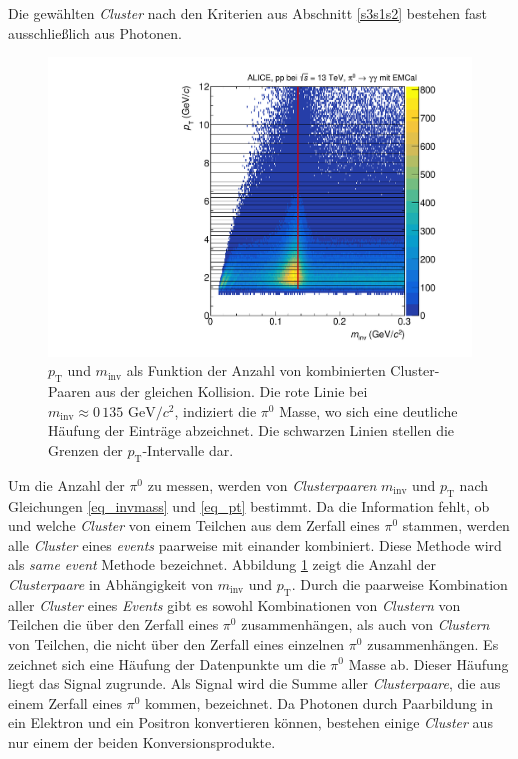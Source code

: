 Die gewählten \textit{Cluster} nach den Kriterien aus Abschnitt \ref{s3s1s2} bestehen fast ausschließlich aus Photonen.
\begin{figure}[t!]
\centering
\includegraphics[width=.7\linewidth]{hInvMass_pT_Signal.pdf}
\caption{$p_\text{T}$ und $m_\text{inv}$ als Funktion der Anzahl von kombinierten  Cluster-Paaren aus der gleichen Kollision.
Die rote Linie bei $m_{\text{inv}}\approx0\,135\text{ GeV/}c^{2}$, indiziert die $\pi^{0}$ Masse, wo sich eine deutliche Häufung der Einträge abzeichnet.
Die schwarzen Linien stellen die Grenzen der $p_{\text{T}}$-Intervalle dar.}
\label{figInvMassPt_a}
\end{figure}
\newline
Um die Anzahl der $\pi^{0}$ zu messen, werden von \textit{Clusterpaaren} $m_\text{inv}$ und $p_\text{T}$ nach Gleichungen \ref{eq_invmass} und \ref{eq_pt} bestimmt.
Da die Information fehlt, ob und welche \textit{Cluster} von einem Teilchen aus dem Zerfall eines $\pi^{0}$ stammen, werden alle \textit{Cluster} eines \textit{events} paarweise mit einander kombiniert.
Diese Methode wird als \textit{same event} Methode bezeichnet.
Abbildung \ref{figInvMassPt_a} zeigt die Anzahl der \textit{Clusterpaare} in Abhängigkeit von $m_{\text{inv}}$ und $p_{\text{T}}$.
Durch die paarweise Kombination aller \textit{Cluster} eines \textit{Events} gibt es sowohl Kombinationen von \textit{Clustern} von Teilchen die über den Zerfall eines $\pi^{0}$ zusammenhängen, als auch von \textit{Clustern} von Teilchen, die nicht über den Zerfall eines einzelnen $\pi^{0}$ zusammenhängen.
\newline
Es zeichnet sich eine Häufung der Datenpunkte um die $\pi^{0}$ Masse ab.
Dieser Häufung liegt das Signal zugrunde.
Als Signal wird die Summe aller \textit{Clusterpaare}, die aus einem Zerfall eines $\pi^{0}$ kommen, bezeichnet.
Da Photonen durch Paarbildung in ein Elektron und ein Positron konvertieren können, bestehen einige \textit{Cluster} aus nur einem der beiden Konversionsprodukte.
